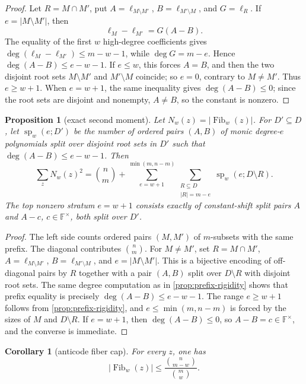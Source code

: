 \documentclass[a4paper,11pt]{amsart}
\newtheorem{proposition}[proposition]{Proposition}
\newtheorem{corollary}[corollary]{Corollary}
\theoremstyle{remark}
\newcommand{\F}{\mathbb F}
\newcommand{\Fib}{\operatorname{Fib}}
\begin{document}
\begin{proof}
Let \(R=M\cap M'\), put \(A=\ell_{M\setminus M'}\), \(B=\ell_{M'\setminus M}\), and \(G=\ell_R\).  If \(e=|M\setminus M'|\), then
\[
        \ell_M-\ell_{M'}=G(A-B).
\]
The equality of the first \(w\) high-degree coefficients gives \(\deg(\ell_M-\ell_{M'})\le m-w-1\), while \(\deg G=m-e\).  Hence \(\deg(A-B)\le e-w-1\).  If \(e\le w\), this forces \(A=B\), and then the two disjoint root sets \(M\setminus M'\) and \(M'\setminus M\) coincide; so \(e=0\), contrary to \(M\ne M'\).  Thus \(e\ge w+1\).  When \(e=w+1\), the same inequality gives \(\deg(A-B)\le0\); since the root sets are disjoint and nonempty, \(A\ne B\), so the constant is nonzero.
\end{proof}

\begin{proposition}[exact second moment]\label{prop:second-moment}
Let \(N_w(z)=|\Fib_w(z)|\).  For \(D'\subseteq D\), let \(\operatorname{sp}_w(e;D')\) be the number of ordered pairs \((A,B)\) of monic degree-\(e\) polynomials split over disjoint root sets in \(D'\) such that \(\deg(A-B)\le e-w-1\).  Then
\[
        \sum_z N_w(z)^2
        =
        \binom{n}{m}
        +
        \sum_{e=w+1}^{\min(m,n-m)}
        \sum_{\substack{R\subseteq D\\ |R|=m-e}}
        \operatorname{sp}_w(e;D\setminus R).
\]
The top nonzero stratum \(e=w+1\) consists exactly of constant-shift split pairs \(A\) and \(A-c\), \(c\in\F^\times\), both split over \(D'\).
\end{proposition}

\begin{proof}
The left side counts ordered pairs \((M,M')\) of \(m\)-subsets with the same prefix.  The diagonal contributes \(\binom{n}{m}\).  For \(M\ne M'\), set \(R=M\cap M'\), \(A=\ell_{M\setminus M'}\), \(B=\ell_{M'\setminus M}\), and \(e=|M\setminus M'|\).  This is a bijective encoding of off-diagonal pairs by \(R\) together with a pair \((A,B)\) split over \(D\setminus R\) with disjoint root sets.  The same degree computation as in \cref{prop:prefix-rigidity} shows that prefix equality is precisely \(\deg(A-B)\le e-w-1\).  The range \(e\ge w+1\) follows from \cref{prop:prefix-rigidity}, and \(e\le\min(m,n-m)\) is forced by the sizes of \(M\) and \(D\setminus R\).  If \(e=w+1\), then \(\deg(A-B)\le0\), so \(A-B=c\in\F^\times\), and the converse is immediate.
\end{proof}

\begin{corollary}[anticode fiber cap]\label{cor:anticode-cap}
For every \(z\), one has
\[
        |\Fib_w(z)|\le \frac{\binom{n}{m-w}}{\binom{m}{w}}.
\]
\end{corollary}
\end{document}
